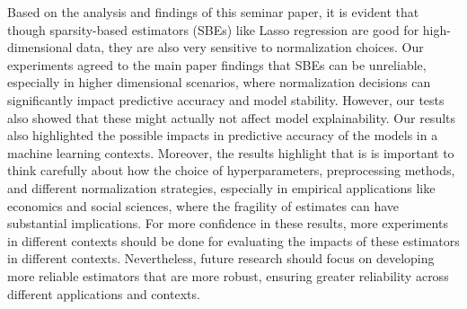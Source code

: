 Based on the analysis and findings of this seminar paper, it is evident that though sparsity-based estimators (SBEs) like Lasso regression are good for high-dimensional data, they are also very sensitive to normalization choices. Our experiments agreed to the main paper findings that SBEs can be unreliable, especially in higher dimensional scenarios, where normalization decisions can significantly impact predictive accuracy and model stability. However, our tests also showed that these might actually not affect model explainability. Our results also highlighted the possible impacts in predictive accuracy of the models in a machine learning contexts. Moreover, the results highlight that is is important to think carefully about how the choice of hyperparameters, preprocessing methods, and different normalization strategies, especially in empirical applications like economics and social sciences, where the fragility of estimates can have substantial implications.  For more confidence in these results, more experiments in different contexts should be done for evaluating the impacts of these estimators in different contexts. Nevertheless, future research should focus on developing more reliable estimators that are more robust, ensuring greater reliability across different applications and contexts.\\

 
